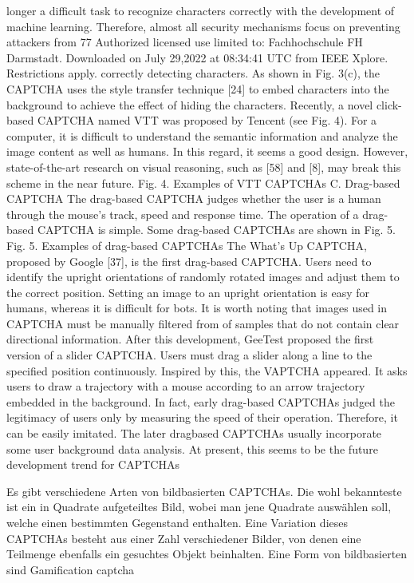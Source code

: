 longer a difficult task to recognize characters correctly with
the development of machine learning. Therefore, almost all
security mechanisms focus on preventing attackers from
77
Authorized licensed use limited to: Fachhochschule FH Darmstadt. Downloaded on July 29,2022 at 08:34:41 UTC from IEEE Xplore. Restrictions apply.
correctly detecting characters. As shown in Fig. 3(c), the
CAPTCHA uses the style transfer technique [24] to embed
characters into the background to achieve the effect of hiding
the characters.
Recently, a novel click-based CAPTCHA named VTT was
proposed by Tencent (see Fig. 4). For a computer, it is
difficult to understand the semantic information and analyze
the image content as well as humans. In this regard, it seems a
good design. However, state-of-the-art research on visual
reasoning, such as [58] and [8], may break this scheme in the
near future.
Fig. 4. Examples of VTT CAPTCHAs
C. Drag-based CAPTCHA
The drag-based CAPTCHA judges whether the user is a
human through the mouse’s track, speed and response time.
The operation of a drag-based CAPTCHA is simple. Some
drag-based CAPTCHAs are shown in Fig. 5.
Fig. 5. Examples of drag-based CAPTCHAs
The What’s Up CAPTCHA, proposed by Google [37], is
the first drag-based CAPTCHA. Users need to identify the
upright orientations of randomly rotated images and adjust
them to the correct position. Setting an image to an upright
orientation is easy for humans, whereas it is difficult for bots.
It is worth noting that images used in CAPTCHA must be
manually filtered from of samples that do not contain clear
directional information. After this development, GeeTest
proposed the first version of a slider CAPTCHA. Users must
drag a slider along a line to the specified position
continuously. Inspired by this, the VAPTCHA appeared. It
asks users to draw a trajectory with a mouse according to an
arrow trajectory embedded in the background.
In fact, early drag-based CAPTCHAs judged the
legitimacy of users only by measuring the speed of their
operation. Therefore, it can be easily imitated. The later dragbased CAPTCHAs usually incorporate some user background
data analysis. At present, this seems to be the future
development trend for CAPTCHAs

Es gibt verschiedene Arten von bildbasierten CAPTCHAs. 
Die wohl bekannteste ist ein in Quadrate aufgeteiltes Bild, wobei man jene Quadrate auswählen soll, welche einen bestimmten Gegenstand enthalten.
Eine Variation dieses CAPTCHAs besteht aus einer Zahl verschiedener Bilder, von denen eine Teilmenge ebenfalls ein gesuchtes Objekt beinhalten.
Eine Form von bildbasierten sind Gamification captcha

